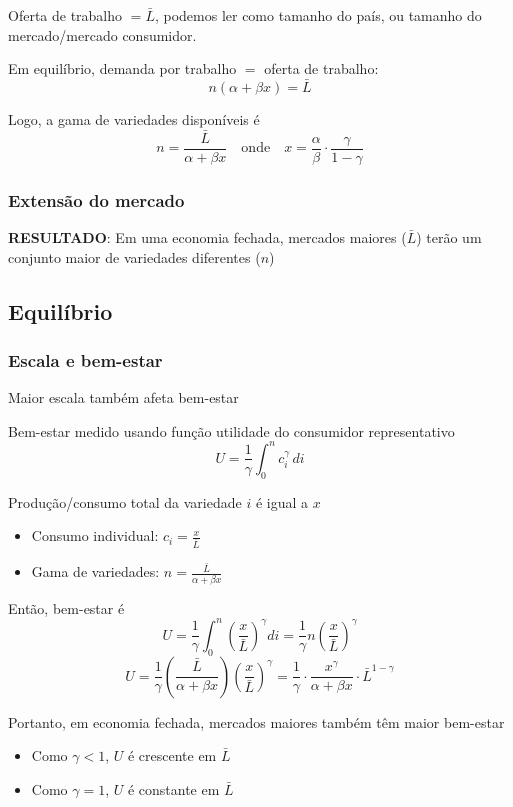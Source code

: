 \documentclass[a4paper,12pt]{article}[abntex2]
\begin{document}
Oferta de trabalho \(= \bar{L}\), podemos ler como tamanho do país, ou tamanho do mercado/mercado consumidor.

Em equilíbrio, demanda por trabalho \(=\) oferta de trabalho:
\[
n(\alpha + \beta x) = \bar{L}
\]

Logo, a gama de variedades disponíveis é
\[
n = \frac{\bar{L}}{\alpha + \beta x} \quad \text{onde} \quad x = \frac{\alpha}{\beta} \cdot \frac{\gamma}{1 - \gamma}
\]

\subsubsection{\textbf{Extensão do mercado}}
\textbf{RESULTADO}: Em uma economia fechada, mercados maiores (\(\bar{L}\)) terão um conjunto maior de variedades diferentes (\(n\))

\subsection{\textbf{Equilíbrio}}
\subsubsection{\textbf{Escala e bem-estar}}
Maior escala também afeta bem-estar

Bem-estar medido usando função utilidade do consumidor representativo
\[
U = \frac{1}{\gamma} \int_0^n c_i^{\gamma} \, di
\]

Produção/consumo total da variedade \(i\) é igual a \(x\)
\begin{itemize}
    \item Consumo individual: \(c_i = \frac{x}{\bar{L}}\)
    \item Gama de variedades: \(n = \frac{\bar{L}}{\alpha + \beta x}\)
\end{itemize}

Então, bem-estar é
\[
U = \frac{1}{\gamma} \int_0^n \left( \frac{x}{\bar{L}} \right)^{\gamma} di = \frac{1}{\gamma} n \left( \frac{x}{\bar{L}} \right)^{\gamma}
\]
\[
U = \frac{1}{\gamma} \left( \frac{\bar{L}}{\alpha + \beta x} \right) \left( \frac{x}{\bar{L}} \right)^{\gamma}
= \frac{1}{\gamma} \cdot \frac{x^{\gamma}}{\alpha + \beta x} \cdot \bar{L}^{1 - \gamma}
\]

Portanto, em economia fechada, mercados maiores também têm maior bem-estar
\begin{itemize}
    \item Como \(\gamma < 1\), \(U\) é crescente em \(\bar{L}\)
    \item Como \(\gamma = 1\), \(U\) é constante em \(\bar{L}\)
\end{itemize}
\end{document}
